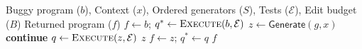 \documentclass[10pt,conference]{IEEEtran}
\begin{document}
\begin{algorithm}[h]
\caption{APR for Programming Assignments}
\label{alg:generic}
\footnotesize
\begin{algorithmic}[1]
\Require Buggy program ($b$), Context ($x$), Ordered generators ($S$), Tests ($\mathcal E$), Edit budget ($B$)
\Ensure Returned program ($f$)
\State $f\gets b$; $q^*\gets\textsc{Execute}(b,\mathcal E)$
 \State $z\gets\mathsf{Generate}(g,x)$
  \State \textbf{continue}
 \EndIf
 \State $q\gets\textsc{Execute}(z,\mathcal E)$
  \State \Return $z$ \EndIf
  \State $f\gets z$; $q^*\gets q$
 \EndIf
\EndFor
\State \Return $f$
\EndProcedure
\end{algorithmic}
\end{algorithm}
\end{document}
